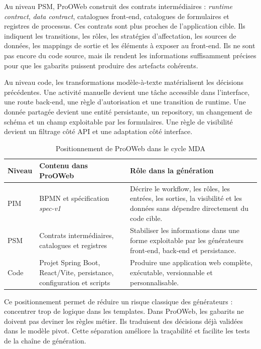 Au niveau PSM, ProOWeb construit des contrats intermédiaires : \textit{runtime contract}, \textit{data contract}, catalogues front-end, catalogues de formulaires et registres de processus. Ces contrats sont plus proches de l'application cible. Ils indiquent les transitions, les rôles, les stratégies d'affectation, les sources de données, les mappings de sortie et les éléments à exposer au front-end. Ils ne sont pas encore du code source, mais ils rendent les informations suffisamment précises pour que les gabarits puissent produire des artefacts cohérents.

Au niveau code, les transformations modèle-à-texte matérialisent les décisions précédentes. Une activité manuelle devient une tâche accessible dans l'interface, une route back-end, une règle d'autorisation et une transition de runtime. Une donnée partagée devient une entité persistante, un repository, un changement de schéma et un champ exploitable par les formulaires. Une règle de visibilité devient un filtrage côté API et une adaptation côté interface.

\begin{table}[H]
\centering
\small
\caption{Positionnement de ProOWeb dans le cycle MDA}
\label{tab:chap3-positionnement-mda}
\begin{tabular}{p{3.2cm}p{5.2cm}p{5.4cm}}
\hline
\textbf{Niveau} & \textbf{Contenu dans ProOWeb} & \textbf{Rôle dans la génération} \\
\hline
PIM & BPMN et spécification \textit{spec-v1} & Décrire le workflow, les rôles, les entrées, les sorties, la visibilité et les données sans dépendre directement du code cible. \\
PSM & Contrats intermédiaires, catalogues et registres & Stabiliser les informations dans une forme exploitable par les générateurs front-end, back-end et persistance. \\
Code & Projet Spring Boot, React/Vite, persistance, configuration et scripts & Produire une application web complète, exécutable, versionnable et personnalisable. \\
\hline
\end{tabular}
\end{table}

Ce positionnement permet de réduire un risque classique des générateurs : concentrer trop de logique dans les templates. Dans ProOWeb, les gabarits ne doivent pas deviner les règles métier. Ils traduisent des décisions déjà validées dans le modèle pivot. Cette séparation améliore la traçabilité et facilite les tests de la chaîne de génération.

